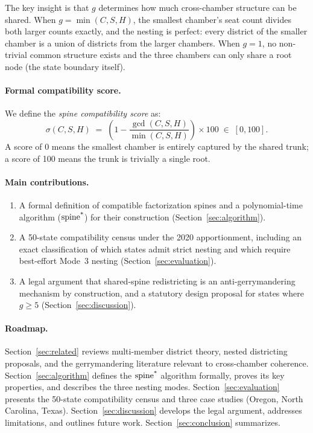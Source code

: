 The key insight is that $g$ determines how much cross-chamber structure can
be shared.  When $g = \min(C, S, H)$, the smallest chamber's seat count divides
both larger counts exactly, and the nesting is perfect: every district of the
smaller chamber is a union of districts from the larger chambers.  When $g = 1$,
no non-trivial common structure exists and the three chambers can only share a
root node (the state boundary itself).

\paragraph{Formal compatibility score.}  We define the
\emph{spine compatibility score} as:
\begin{equation}
  \label{eq:score}
  \sigma(C, S, H) \;=\; \left(1 - \frac{\gcd(C,S,H)}{\min(C,S,H)}\right) \times 100 \;\in\; [0, 100].
\end{equation}
A score of 0 means the smallest chamber is entirely captured by the shared
trunk; a score of 100 means the trunk is trivially a single root.

\paragraph{Main contributions.}
\begin{enumerate}
  \item A formal definition of compatible factorization spines and a
        polynomial-time algorithm ($\operatorname{spine^*}$) for their construction
        (Section~\ref{sec:algorithm}).
  \item A 50-state compatibility census under the 2020 apportionment, including
        an exact classification of which states admit strict nesting and which
        require best-effort Mode~3 nesting (Section~\ref{sec:evaluation}).
  \item A legal argument that shared-spine redistricting is an anti-gerrymandering
        mechanism by construction, and a statutory design proposal for states
        where $g \geq 5$ (Section~\ref{sec:discussion}).
\end{enumerate}

\paragraph{Roadmap.}  Section~\ref{sec:related} reviews multi-member district
theory, nested districting proposals, and the gerrymandering literature
relevant to cross-chamber coherence.  Section~\ref{sec:algorithm} defines
the $\operatorname{spine^*}$ algorithm formally, proves its key properties, and describes the
three nesting modes.  Section~\ref{sec:evaluation} presents the 50-state
compatibility census and three case studies (Oregon, North Carolina, Texas).
Section~\ref{sec:discussion} develops the legal argument, addresses limitations,
and outlines future work.  Section~\ref{sec:conclusion} summarizes.


